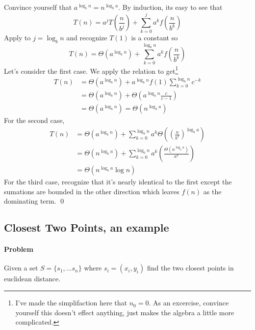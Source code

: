 \documentclass[11pt]{article}
\theoremstyle{plain}
\theoremstyle{definition}
\numberwithin{equation}{section}
\numberwithin{figure}{section}
\begin{document}
\proof Convince yourself that $a^{\log_b n} = n^{\log_b a}$. By induction, its easy to see that 
\begin{equation}
T(n) = a^j T\left(\frac{n}{b^j}\right) + \sum_{k = 0}^j a^k f\left(\frac{n}{b^k}\right)
\end{equation}
Apply to $j = \log_b n$ and recognize $T(1)$ is a constant so
\begin{equation}
T(n) = \Theta(a^{\log_b n}) + \sum_{k = 0}^{\log_b n} a^k f\left(\frac{n}{b^k}\right)
\end{equation}
Let's consider the first case. We apply the relation to get\footnote{I've made the simplifaction here that $n_0 = 0$. As an excercise, convince yourself this doesn't effect anything, just makes the algebra a little more complicated.} 
\begin{equation}
\begin{aligned}
T(n) &= \Theta(a^{\log_b n}) + a^{\log_b n} f(1) \sum_{k = 0}^{\log_b n} c^{-k} \\
&= \Theta(a^{\log_b n}) + \Theta \left(a^{\log_b n} \frac{c}{c-1}\right) \\
&= \Theta(a^{\log_b n}) = \Theta(n^{\log_b a})
\end{aligned}
\end{equation}
For the second case,
\begin{equation}
\begin{aligned}
T(n) &= \Theta(a^{\log_b n}) + \sum_{k = 0}^{\log_b n} a^k \Theta \left( \left( \frac{n}{b^k} \right)^{\log_b a} \right) \\
&= \Theta(n^{\log_b a}) + \sum_{k = 0}^{\log_b n} a^k \left( \frac{\Theta(n^{\log_b a})}{a^k} \right) \\
&= \Theta(n^{\log_b a} \log n)
\end{aligned}
\end{equation}
For the third case, recognize that it's nearly identical to the first except the sumations are bounded in the other direction which leaves $f(n)$ as the dominating term. \qed

\subsection{Closest Two Points, an example}

\paragraph{Problem} Given a set $S = \{s_1, \ldots s_n\}$ where $s_i = (x_i, y_i)$ find the two closest points in euclidean distance.
\end{document}

